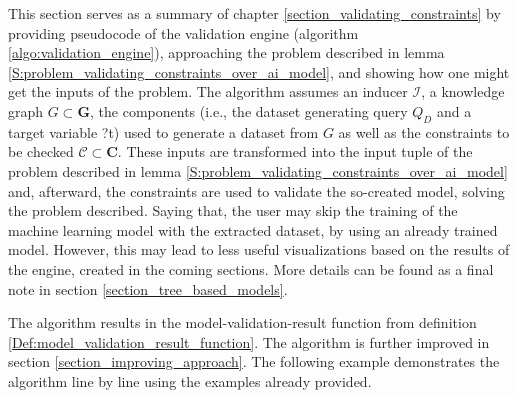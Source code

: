 
    This section serves as a summary of chapter \ref{section_validating_constraints} by providing pseudocode of the validation engine (algorithm \ref{algo:validation_engine}), approaching the problem described in lemma \ref{S:problem_validating_constraints_over_ai_model}, and showing how one might get the inputs of the problem. 
    The algorithm assumes an inducer $\mathcal{I}$, a knowledge graph $G \subset \mathbf{G}$, the components (i.e., the dataset generating query $Q_D$ and a target variable ?t) used to generate a dataset from $G$ as well as the constraints to be checked $\mathcal{C} \subset \mathbf{C}$.
    These inputs are transformed into the input tuple of the problem described in lemma \ref{S:problem_validating_constraints_over_ai_model} and, afterward, the constraints are used to validate the so-created model, solving the problem described. Saying that, the user may skip the training of the machine learning model with the extracted dataset, by using an already trained model. However, this may lead to less useful visualizations based on the results of the engine, created in the coming sections. More details can be found as a final note in section \ref{section_tree_based_models}.
    
    The algorithm results in the model-validation-result function from definition \ref{Def:model_validation_result_function}. The algorithm is further improved in section \ref{section_improving_approach}.
    The following example demonstrates the algorithm line by line using the examples already provided.
    
